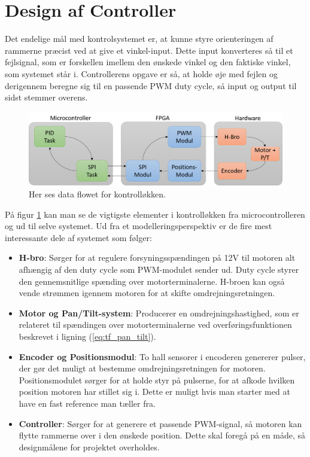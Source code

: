 \section{Design af Controller}

Det endelige mål med kontrolsystemet er, at kunne styre orienteringen af rammerne præcist ved at give et vinkel-input. Dette input konverteres så til et fejlsignal, som er forskellen imellem den ønskede vinkel og den faktiske vinkel, som systemet står i. Controllerens opgave er så, at holde øje med fejlen og derigennem beregne sig til en passende PWM duty cycle, så input og output til sidst stemmer overens. 

\begin{figure}[ht]
	\begin{center}
		\includegraphics[scale=0.5]{Billeder/Controller_Blok.png}
	\end{center}
\caption{Her ses data flowet for kontrolløkken.}
\label{fig:Blok_Model}
\end{figure}

På figur \ref{fig:Blok_Model} kan man se de vigtigste elementer i kontrolløkken fra microcontrolleren og ud til selve systemet. Ud fra et modelleringsperspektiv er de fire mest interessante dele af systemet som følger:

\begin{itemize}
\item \textbf{H-bro}: Sørger for at regulere forsyningsspændingen på 12V til motoren alt afhængig af den duty cycle som PWM-modulet sender ud. Duty cycle styrer den gennemsnitlige spænding over motorterminalerne. H-broen kan også vende strømmen igennem motoren for at skifte omdrejningsretningen.
\item \textbf{Motor og Pan/Tilt-system}: Producerer en omdrejningshastighed, som er relateret til spændingen over motorterminalerne ved overføringsfunktionen beskrevet i ligning (\ref{eq:tf_pan_tilt}).
\item \textbf{Encoder og Positionsmodul}: To hall sensorer i encoderen genererer pulser, der gør det muligt at bestemme omdrejningsretningen for motoren. Positionsmodulet sørger for at holde styr på pulserne, for at afkode hvilken position motoren har stillet sig i. Dette er muligt hvis man starter med at have en fast reference man tæller fra.
\item \textbf{Controller}: Sørger for at generere et passende PWM-signal, så motoren kan flytte rammerne over i den ønskede position. Dette skal foregå på en måde, så designmålene for projektet overholdes.
\end{itemize}

